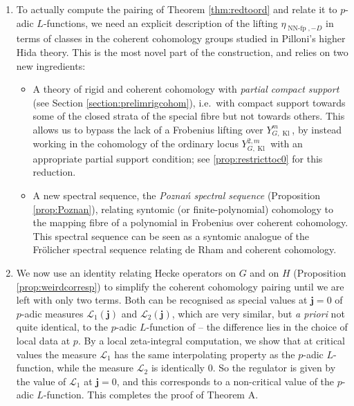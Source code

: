 \documentclass[cjm]{ipart}
\theoremstyle{plain}
\theoremstyle{remark}
\DeclareMathOperator{\Kl}{Kl}
\DeclareMathOperator{\NNfp}{NN-fp}
\newcommand{\bfj}{\mathbf{j}}
\newcommand{\sL}{\mathscr{L}}
\numberwithin{equation}{subsection}
\begin{document}
\begin{enumerate}
   \item To actually compute the pairing of Theorem \ref{thm:redtoord} and relate it to $p$-adic $L$-functions, we need an explicit description of the lifting $\eta_{\NNfp,-D}$ in terms of classes in the coherent cohomology groups studied in Pilloni's higher Hida theory. This is the most novel part of the construction, and relies on two new ingredients:
   \begin{itemize}
    \item A theory of rigid and coherent cohomology with \emph{partial compact support} (see Section \ref{section:prelimrigcohom}), i.e.~with compact support towards some of the closed strata of the special fibre but not towards others. This allows us to bypass the lack of a Frobenius lifting over $Y_{G, \Kl}^m$, by instead working in the cohomology of the ordinary locus $Y_{G, \Kl}^{2,m}$ with an appropriate partial support condition; see \cref{prop:restricttoc0} for this reduction.

    \item A new  spectral sequence, the \emph{Pozna\'n spectral sequence} %
    (Proposition \ref{prop:Poznan}), relating syntomic (or finite-polynomial) cohomology to the mapping fibre of a polynomial in Frobenius over coherent cohomology. This spectral sequence can be seen as a syntomic analogue of the Fr\"olicher spectral sequence relating de Rham and coherent cohomology.
   \end{itemize}

   \item We now use an identity relating Hecke operators  on $G$ and on $H$ (Proposition \ref{prop:weirdcorresp}) to simplify the coherent cohomology pairing until we are left with only two terms. Both can be recognised as special values at $\bfj = 0$ of $p$-adic measures $\sL_1(\bfj)$ and $\sL_2(\bfj)$, which are very similar, but \emph{a priori} not quite identical, to the $p$-adic $L$-function of \cite{LPSZ1} -- the difference lies in the choice of local data at $p$. By a local zeta-integral computation, we show that at critical values the measure $\sL_1$ has the same interpolating property as the $p$-adic $L$-function, while the measure $\sL_2$ is identically 0. So the regulator is given by the value of $\sL_1$ at $\bfj = 0$, and this corresponds to a non-critical value of the $p$-adic $L$-function. This completes the proof of Theorem A.
  \end{enumerate}
\end{document}
